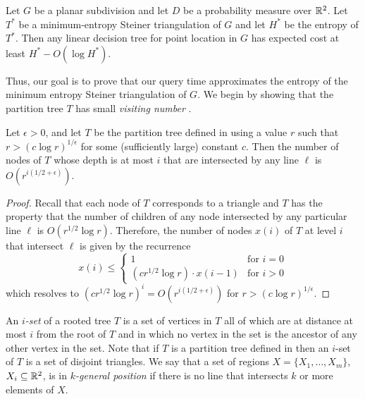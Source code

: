 \documentclass{patmorin}
\begin{document}
\begin{thm}
Let $G$ be a planar subdivision and let $D$ be a probability measure
over $\mathbb{R}^2$.  Let $T^*$ be a  minimum-entropy Steiner triangulation of
$G$ and let $H^*$ be the entropy of $T^*$.  Then any linear decision tree
for point location in $G$ has expected cost at least $H^*-O(\log H^*)$.
\end{thm}

Thus, our goal is to prove that our query time approximates the entropy
of the minimum entropy Steiner triangulation of $G$.  We begin by showing
that the partition tree $T$ has small \emph{visiting number} \cite{hw87}.

\begin{lem}
  Let $\epsilon > 0$, and let $T$ be the partition tree defined
  in  using a value $r$ such that $r>(c\log
  r)^{1/\epsilon}$ for some (sufficiently large) constant $c$.  Then the
  number of nodes of $T$ whose depth is at most $i$ that are intersected
  by any line $\ell$ is $O(r^{i(1/2+\epsilon)})$.
\end{lem}

\begin{proof}
  Recall that each node of $T$ corresponds to a triangle and $T$ has
  the property that the number of children of any node intersected by
  any particular line $\ell$ is $O(r^{1/2}\log r)$. Therefore, the number
  of nodes $x(i)$ of $T$ at level $i$ that intersect $\ell$ is given by
  the recurrence
  \[
     x(i)\le 
      \left\{
       \begin{array}{ll}
          1 & \mbox{for $i=0$} \\
          (cr^{1/2}\log r)\cdot x(i-1) & \mbox{for $i>0$}
       \end{array}
      \right.
\]
which resolves to $(cr^{1/2}\log r)^i= O(r^{i(1/2+\epsilon)})$ for 
$r>(c\log r)^{1/\epsilon}$.
\end{proof}

An \emph{$i$-set} of a rooted tree $T$ is a set of vertices in $T$ all
of which are at distance at most $i$ from the root of $T$ and in which
no vertex in the set is the ancestor of any other vertex in the set.
Note that if $T$ is a partition tree defined in 
then an $i$-set of $T$ is a set of disjoint triangles.  We say that
a set of regions $X=\{X_1,\ldots,X_m\}$, $X_i\subseteq\mathbb{R}^2$, is in
\emph{$k$-general position} if there is no line that intersects $k$
or more elements of $X$.
\end{document}
